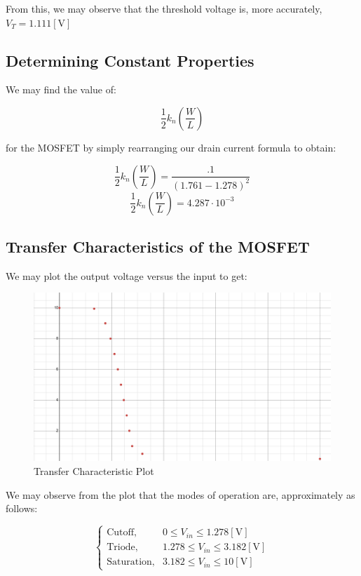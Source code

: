 \documentclass[
	letterpaper, %
	10pt, %
]{CSUniSchoolLabReport}
\begin{document}
From this, we may observe that the threshold voltage is, more accurately, $\boxed{V_T=1.111[\si{\volt}]}$

\subsection{Determining Constant Properties}

We may find the value of:

$$\frac{1}{2}k_n\left( \frac{W}{L} \right)$$

for the MOSFET by simply rearranging our drain current formula to obtain:

$$\frac{1}{2}k_n\left( \frac{W}{L} \right)=\frac{.1}{(1.761-1.278)^2}$$
$$\boxed{\frac{1}{2}k_n\left( \frac{W}{L} \right)=4.287\cdot10^{-3}}$$

\subsection{Transfer Characteristics of the MOSFET}

We may plot the output voltage versus the input to get:

\begin{figure}[H]
  \centering
  \includegraphics[width=.9\textwidth]{Figures/L5F3}
  \caption{Transfer Characteristic Plot}
  \label{fig:3}
\end{figure}

We may observe from the plot that the modes of operation are, approximately as follows:

$$\boxed{\left\{\begin{array}{ll} \text{Cutoff},&0\leq V_{in}\leq 1.278[\si{\volt}]\\\text{Triode},&1.278\leq V_{in}\leq 3.182[\si{\volt}]\\\text{Saturation},&3.182\leq V_{in}\leq 10[\si{\volt}]\end{array}}$$
\end{document}
